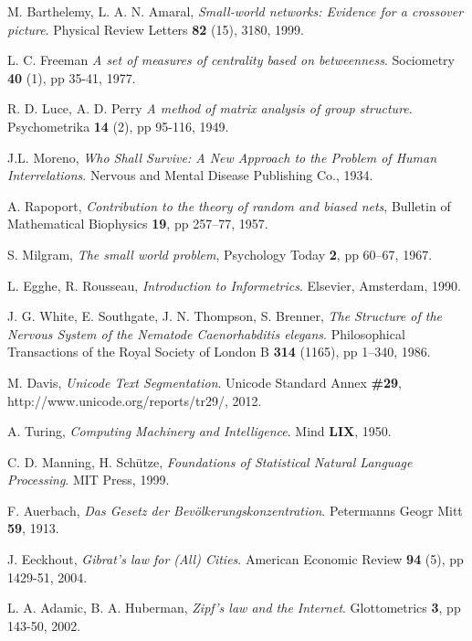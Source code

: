 \begin{thebibliography}{99}
  M. Barthelemy, L. A. N. Amaral,
  \emph{Small-world networks: Evidence for a crossover picture}.
  Physical Review Letters \textbf{82} (15), 3180,
  1999.

  L. C. Freeman
  \emph{A set of measures of centrality based on betweenness}.
  Sociometry \textbf{40} (1), pp 35-41,
  1977.

  R. D. Luce, A. D. Perry
  \emph{A method of matrix analysis of group structure}.
  Psychometrika \textbf{14} (2), pp 95-116,
  1949.

  J.L. Moreno,
  \emph{Who Shall Survive: A New Approach to the Problem of Human Interrelations}.
  Nervous and Mental Disease Publishing Co.,
  1934.

  A. Rapoport, 
  \emph{Contribution to the theory of random and biased nets},
  Bulletin of Mathematical Biophysics \textbf{19}, pp 257–77,
  1957.

  S. Milgram,
  \emph{The small world problem},
  Psychology Today \textbf{2}, pp 60–67,
  1967.

  L. Egghe, R. Rousseau,
  \emph{Introduction to Informetrics}.
  Elsevier, Amsterdam,
  1990.

  J. G. White, E. Southgate, J. N. Thompson, S. Brenner,
  \emph{The Structure of the Nervous System of the Nematode Caenorhabditis elegans}.
  Philosophical Transactions of the Royal Society of London B \textbf{314} (1165), pp 1–340,
  1986.

  M. Davis,
  \emph{Unicode Text Segmentation}.
  Unicode Standard Annex \textbf{\#29}, http://www.unicode.org/reports/tr29/,
  2012.
  
  A. Turing,
  \emph{Computing Machinery and Intelligence}.
  Mind \textbf{LIX},
  1950.

  C. D. Manning, H. Schütze,
  \emph{Foundations of Statistical Natural Language Processing}.
  MIT Press,
  1999.

  F. Auerbach,
  \emph{Das Gesetz der Bevölkerungskonzentration}.
  Petermanns Geogr Mitt \textbf{59},
  1913.

  J. Eeckhout,
  \emph{Gibrat's law for (All) Cities}.
  American Economic Review \textbf{94} (5), pp 1429-51,
  2004.

  L. A. Adamic, B. A. Huberman,
  \emph{Zipf’s law and the Internet}.
  Glottometrics \textbf{3}, pp 143-50,
  2002.


\end{thebibliography}
